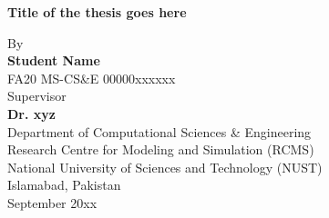 \documentclass[11pt,a4paper]{report}
\numberwithin{equation}{section}
\begin{document}
    \newpage
    \begin{titlepage}
        \centering
        \vspace {1cm}
        \huge{\textbf{Title of the thesis goes here}} \\ [0.75cm]
        \begin{figure}[ht!]
            \centering
            \def\svgwidth{0.5\columnwidth}
            
        \end{figure}
        \vspace {0.5cm}
        \Large{By} \\
        \Large{\textbf{Student Name}} \\
        \Large{FA20 MS-CS\&E 00000xxxxxx} \\[0.75cm]
        \Large{Supervisor} \\
        \Large{\textbf{Dr. xyz}} \\[0.75cm]
        \Large{
        Department of Computational Sciences \& Engineering \\
        Research Centre for Modeling and Simulation (RCMS) \\
        National University of Sciences and Technology (NUST) \\
        Islamabad, Pakistan} \\ [0.75 cm]
        \Large{September 20xx}
    \end{titlepage}
\end{document}
